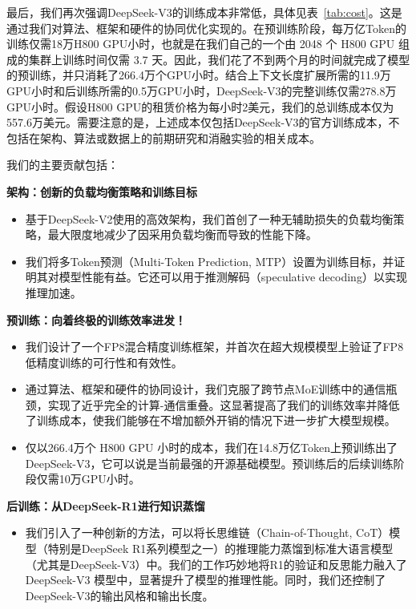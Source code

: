 \documentclass[lang=cn,a4paper,newtx]{elegantpaper}
\newcommand{\dsvii}{DeepSeek-V2}
\newcommand{\dsviii}{DeepSeek-V3}
\begin{document}
最后，我们再次强调\dsviii{}的训练成本非常低，具体见表~\ref{tab:cost}。这是通过我们对算法、框架和硬件的协同优化实现的。在预训练阶段，每万亿Token的训练仅需18万H800 GPU小时，也就是在我们自己的一个由 2048 个 H800 GPU 组成的集群上训练时间仅需 3.7 天。因此，我们花了不到两个月的时间就完成了模型的预训练，并只消耗了266.4万个GPU小时。结合上下文长度扩展所需的11.9万GPU小时和后训练所需的0.5万GPU小时，\dsviii{}的完整训练仅需278.8万GPU小时。假设H800 GPU的租赁价格为每小时2美元，我们的总训练成本仅为557.6万美元。需要注意的是，上述成本仅包括\dsviii{}的官方训练成本，不包括在架构、算法或数据上的前期研究和消融实验的相关成本。

我们的主要贡献包括：

\noindent
\textbf{架构：创新的负载均衡策略和训练目标}
\begin{itemize}[topsep=0pt]
    \item
    基于\dsvii{}使用的高效架构，我们首创了一种无辅助损失的负载均衡策略，最大限度地减少了因采用负载均衡而导致的性能下降。
    \item
    我们将多Token预测（Multi-Token Prediction, MTP）设置为训练目标，并证明其对模型性能有益。它还可以用于推测解码（speculative decoding）以实现推理加速。
\end{itemize}

\noindent
\textbf{预训练：向着终极的训练效率进发！}
\begin{itemize}[topsep=0pt]
    \item
    我们设计了一个FP8混合精度训练框架，并首次在超大规模模型上验证了FP8低精度训练的可行性和有效性。
    \item 
    通过算法、框架和硬件的协同设计，我们克服了跨节点MoE训练中的通信瓶颈，实现了近乎完全的计算-通信重叠。这显著提高了我们的训练效率并降低了训练成本，使我们能够在不增加额外开销的情况下进一步扩大模型规模。
    \item
    仅以266.4万个 H800 GPU 小时的成本，我们在14.8万亿Token上预训练出了DeepSeek-V3，它可以说是当前最强的开源基础模型。预训练后的后续训练阶段仅需10万GPU小时。
\end{itemize}

\noindent
\textbf{后训练：从DeepSeek-R1进行知识蒸馏}
\begin{itemize}[topsep=0pt]
    \item 
    我们引入了一种创新的方法，可以将长思维链（Chain-of-Thought, CoT）模型（特别是DeepSeek R1系列模型之一）的推理能力蒸馏到标准大语言模型（尤其是DeepSeek-V3）中。我们的工作巧妙地将R1的验证和反思能力融入了 DeepSeek-V3 模型中，显著提升了模型的推理性能。同时，我们还控制了DeepSeek-V3的输出风格和输出长度。
\end{itemize}
\end{document}
